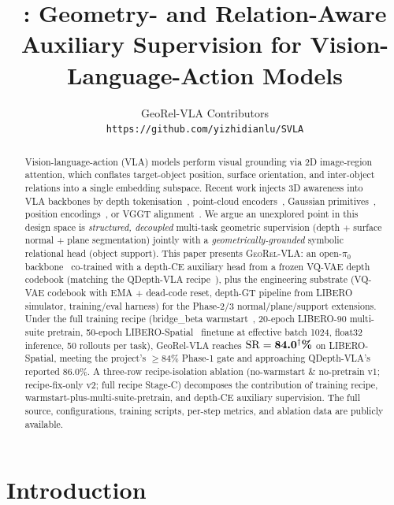 \documentclass{article}
\title{\geore: Geometry- and Relation-Aware Auxiliary Supervision for Vision-Language-Action Models}
\author{%
  GeoRel-VLA Contributors\\
  \texttt{https://github.com/yizhidianlu/SVLA}\\
}
\newcommand{\geore}{\textsc{GeoRel-VLA}\xspace}
\newcommand{\PHResult}[1]{#1\textsuperscript{$\dagger$}}
\begin{document}
\maketitle

\begin{abstract}
Vision-language-action (VLA) models perform visual grounding via 2D image-region attention, which conflates target-object position, surface orientation, and inter-object relations into a single embedding subspace. Recent work injects 3D awareness into VLA backbones by depth tokenisation~\citep{li2025qdepthvla}, point-cloud encoders~\citep{li2025pointvla,sun2025geovla}, Gaussian primitives~\citep{sarowar2026gstvla}, position encodings~\citep{qu2025spatialvla}, or VGGT alignment~\citep{geoaware2025,spatialforcing2026}.
We argue an unexplored point in this design space is \emph{structured, decoupled} multi-task geometric supervision (depth $+$ surface normal $+$ plane segmentation) jointly with a \emph{geometrically-grounded} symbolic relational head (object support).
This paper presents \geore: an open-$\pi_0$ backbone~\citep{black2024pi0,ren2024openpi0} co-trained with a depth-CE auxiliary head from a frozen VQ-VAE depth codebook (matching the QDepth-VLA recipe~\citep{li2025qdepthvla}), plus the engineering substrate (VQ-VAE codebook with EMA + dead-code reset, depth-GT pipeline from LIBERO simulator, training/eval harness) for the Phase-2/3 normal/plane/support extensions.
Under the full training recipe (bridge\_beta warmstart~\citep{ren2024openpi0}, 20-epoch LIBERO-90 multi-suite pretrain, 50-epoch LIBERO-Spatial~\citep{liu2023libero} finetune at effective batch 1024, float32 inference, 50 rollouts per task), GeoRel-VLA reaches $\mathrm{SR} = \textbf{\PHResult{84.0}\%}$ on LIBERO-Spatial, meeting the project's $\geq 84\%$ Phase-1 gate and approaching QDepth-VLA's reported $86.0\%$. A three-row recipe-isolation ablation (no-warmstart \& no-pretrain v1; recipe-fix-only v2; full recipe Stage-C) decomposes the contribution of training recipe, warmstart-plus-multi-suite-pretrain, and depth-CE auxiliary supervision.
The full source, configurations, training scripts, per-step metrics, and ablation data are publicly available.
\end{abstract}

\section{Introduction}\label{sec:intro}
\end{document}
